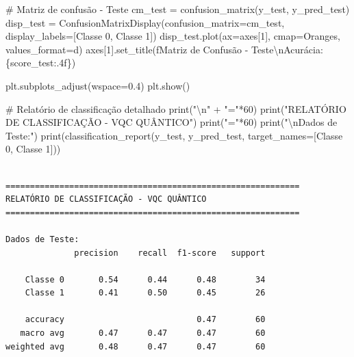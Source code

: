 \documentclass[
  brazilian,
]{report}
\newenvironment{Shaded}{\begin{snugshade}}{\end{snugshade}}
\newcommand{\BuiltInTok}[1]{\textcolor[rgb]{0.00,0.23,0.31}{#1}}
\newcommand{\CharTok}[1]{\textcolor[rgb]{0.13,0.47,0.30}{#1}}
\newcommand{\CommentTok}[1]{\textcolor[rgb]{0.37,0.37,0.37}{#1}}
\newcommand{\DecValTok}[1]{\textcolor[rgb]{0.68,0.00,0.00}{#1}}
\newcommand{\FloatTok}[1]{\textcolor[rgb]{0.68,0.00,0.00}{#1}}
\newcommand{\NormalTok}[1]{\textcolor[rgb]{0.00,0.23,0.31}{#1}}
\newcommand{\OperatorTok}[1]{\textcolor[rgb]{0.37,0.37,0.37}{#1}}
\newcommand{\SpecialCharTok}[1]{\textcolor[rgb]{0.37,0.37,0.37}{#1}}
\newcommand{\SpecialStringTok}[1]{\textcolor[rgb]{0.13,0.47,0.30}{#1}}
\newcommand{\StringTok}[1]{\textcolor[rgb]{0.13,0.47,0.30}{#1}}
\begin{document}
\begin{tcolorbox}
\begin{Shaded}
\begin{Highlighting}[]
\CommentTok{\# Matriz de confusão {-} Teste}
\NormalTok{cm\_test }\OperatorTok{=}\NormalTok{ confusion\_matrix(y\_test, y\_pred\_test)}
\NormalTok{disp\_test }\OperatorTok{=}\NormalTok{ ConfusionMatrixDisplay(confusion\_matrix}\OperatorTok{=}\NormalTok{cm\_test, display\_labels}\OperatorTok{=}\NormalTok{[}\StringTok{\textquotesingle{}Classe 0\textquotesingle{}}\NormalTok{, }\StringTok{\textquotesingle{}Classe 1\textquotesingle{}}\NormalTok{])}
\NormalTok{disp\_test.plot(ax}\OperatorTok{=}\NormalTok{axes[}\DecValTok{1}\NormalTok{], cmap}\OperatorTok{=}\StringTok{\textquotesingle{}Oranges\textquotesingle{}}\NormalTok{, values\_format}\OperatorTok{=}\StringTok{\textquotesingle{}d\textquotesingle{}}\NormalTok{)}
\NormalTok{axes[}\DecValTok{1}\NormalTok{].set\_title(}\SpecialStringTok{f\textquotesingle{}Matriz de Confusão {-} Teste}\CharTok{\textbackslash{}n}\SpecialStringTok{Acurácia: }\SpecialCharTok{\{}\NormalTok{score\_test}\SpecialCharTok{:.4f\}}\SpecialStringTok{\textquotesingle{}}\NormalTok{)}

\NormalTok{plt.subplots\_adjust(wspace}\OperatorTok{=}\FloatTok{0.4}\NormalTok{)}
\NormalTok{plt.show()}

\CommentTok{\# Relatório de classificação detalhado}
\BuiltInTok{print}\NormalTok{(}\StringTok{"}\CharTok{\textbackslash{}n}\StringTok{"} \OperatorTok{+} \StringTok{"="}\OperatorTok{*}\DecValTok{60}\NormalTok{)}
\BuiltInTok{print}\NormalTok{(}\StringTok{"RELATÓRIO DE CLASSIFICAÇÃO {-} VQC QUÂNTICO"}\NormalTok{)}
\BuiltInTok{print}\NormalTok{(}\StringTok{"="}\OperatorTok{*}\DecValTok{60}\NormalTok{)}
\BuiltInTok{print}\NormalTok{(}\StringTok{"}\CharTok{\textbackslash{}n}\StringTok{Dados de Teste:"}\NormalTok{)}
\BuiltInTok{print}\NormalTok{(classification\_report(y\_test, y\_pred\_test, target\_names}\OperatorTok{=}\NormalTok{[}\StringTok{\textquotesingle{}Classe 0\textquotesingle{}}\NormalTok{, }\StringTok{\textquotesingle{}Classe 1\textquotesingle{}}\NormalTok{]))}
\end{Highlighting}
\end{Shaded}

\end{tcolorbox}

\begin{verbatim}

============================================================
RELATÓRIO DE CLASSIFICAÇÃO - VQC QUÂNTICO
============================================================

Dados de Teste:
              precision    recall  f1-score   support

    Classe 0       0.54      0.44      0.48        34
    Classe 1       0.41      0.50      0.45        26

    accuracy                           0.47        60
   macro avg       0.47      0.47      0.47        60
weighted avg       0.48      0.47      0.47        60
\end{verbatim}
\end{document}

